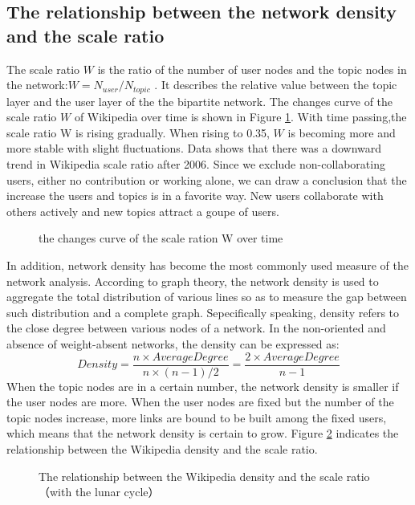 \documentclass{elsarticle}
\begin{document}
\subsection{The relationship between the network density and the scale ratio}
\label{sec:relat-betw-netw}
 The scale
ratio $W$ is the ratio of the number of user nodes and the topic nodes in
the network:$W=N_{user}/N_{topic}$ . It describes the relative
value between the topic layer and the user layer of the the bipartite
network. The changes curve of the scale ratio $W$ of Wikipedia over time
is shown in Figure \ref{fig:scale-ratio}. With time passing,the scale ratio W is rising
gradually. When rising to 0.35, $W$ is becoming more and more stable
with slight fluctuations. Data shows that there was a downward trend in
Wikipedia scale ratio after 2006. Since we exclude non-collaborating
users, either no contribution or working alone, we can draw a
conclusion that the increase the users and topics is in a favorite
way. New users collaborate with others actively and new topics attract
a goupe of users.
\begin{figure}[htpb]
  \centering
  \scalebox{0.3}{\texttt{[image: 08]}}
  \caption{the changes curve of the scale ration W over time}
  \label{fig:scale-ratio}
\end{figure}
In addition, network density has become the most commonly used measure
of the network analysis. According to graph theory, the network
density is used to aggregate the total distribution of various lines
so as to measure the gap between such distribution and a complete
graph. Sepecifically speaking, density refers to the close degree between various nodes of a network. In the non-oriented and absence of weight-absent  networks, the density can be expressed as:
\begin{equation}
  \label{eq:3}
  Density=\frac{n\times AverageDegree}{n\times(n-1)/2}=\frac{2\times AverageDegree}{n-1}
\end{equation}
When the topic nodes are in a certain number, the network density is
smaller if the user nodes are more. When the user nodes are fixed but the
number of the topic nodes increase, more links are bound to be built
among the fixed users, which means that the network density is certain
to grow. Figure \ref{fig:density-scale} indicates the relationship between the Wikipedia density and the scale ratio. 
\begin{figure}[htpb]
  \centering
  \scalebox{0.3}{\texttt{[image: 09]}}
  \caption{The relationship between the Wikipedia density and the
    scale ratio （with the lunar cycle）}
  \label{fig:density-scale}
\end{figure}
\end{document}
